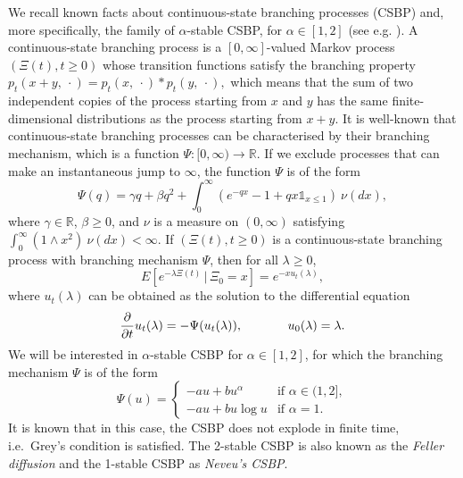 \documentclass[11pt]{article}
\theoremstyle{plain}
\begin{document}
We recall known facts about continuous-state branching processes (CSBP) and, more specifically, the family of $\alpha$-stable CSBP, for $\alpha\in[1,2]$ (see e.g. \cite{berestycki2009recent,Birkner2005}). A continuous-state branching process is a $[0, \infty]$-valued Markov process $(\Xi(t), t \geq 0)$ whose transition functions satisfy the branching property $p_t(x + y, \: \cdot) = p_t(x, \: \cdot) * p_t(y, \: \cdot),$ which means that the sum of two independent copies of the process starting from $x$ and $y$ has the same finite-dimensional distributions as the process starting from $x + y$.  It is well-known that continuous-state branching processes can be characterised by their branching mechanism, which is a function $\Psi: [0, \infty) \rightarrow \mathbb{R}$.  If we exclude processes that can make an instantaneous jump to $\infty$, the function $\Psi$ is of the form $$\Psi(q) = \gamma q + \beta q^2 + \int_0^{\infty} (e^{-qx} - 1 + qx \mathbb{1}_{x \leq 1}) \: \nu(dx),$$ where $\gamma \in \mathbb{R}$, $\beta \geq 0$, and $\nu$ is a measure on $(0, \infty)$ satisfying $\int_0^{\infty} (1 \wedge x^2) \: \nu(dx) < \infty$.  If $(\Xi(t), t \geq 0)$ is a continuous-state branching process with branching mechanism $\Psi$, then for all $\lambda \geq 0$, 
\begin{equation}\label{csbpLaplace}
E[e^{-\lambda \Xi(t)} \,| \, \Xi_0 = x] = e^{-x u_t(\lambda)},
\end{equation}
where $u_t(\lambda)$ can be obtained as the solution to the differential equation
\begin{equation}\label{diffeq}
\frac{\partial}{\partial t} u_t(\lambda) = -\Psi(u_t(\lambda)), \hspace{.5in} u_0(\lambda) = \lambda.
\end{equation}
We will be interested in $\alpha$-stable CSBP for $\alpha\in[1,2]$, for which the branching mechanism $\Psi$ is of the form
\begin{equation}
\label{eq:Psi}
\Psi(u) = 
\begin{cases}
-au + b u^\alpha & \text{if } \alpha \in (1,2],\\
-au + b u\log u & \text{if } \alpha = 1.
\end{cases}
\end{equation}
It is known that in this case, the CSBP does not explode in finite time, i.e.~Grey's condition is satisfied. The 2-stable CSBP is also known as the \emph{Feller diffusion} and the 1-stable CSBP as \emph{Neveu's CSBP}.
\end{document}
